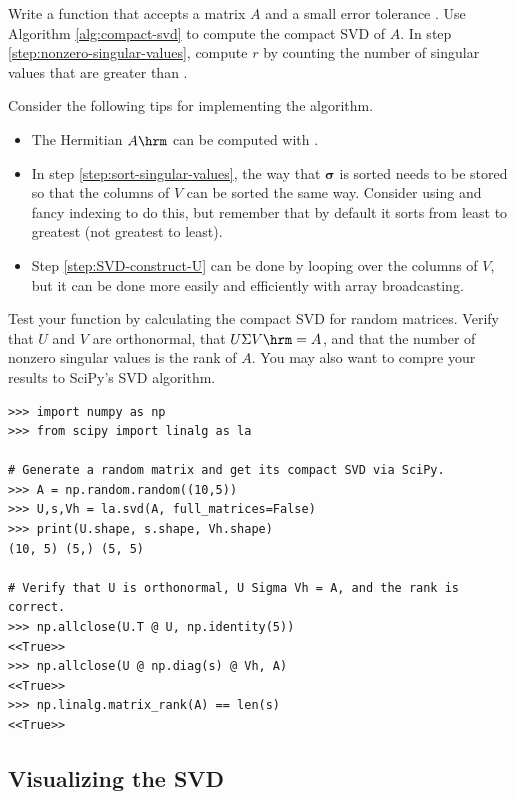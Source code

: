 \begin{problem} %
Write a function that accepts a matrix $A$ and a small error tolerance .
Use Algorithm \ref{alg:compact-svd} to compute the compact SVD of $A$.
In step \ref{step:nonzero-singular-values}, compute $r$ by counting the number of singular values that are greater than .

Consider the following tips for implementing the algorithm.
\begin{itemize}
    \item The Hermitian $A\hrm$ can be computed with .
    \item In step \ref{step:sort-singular-values}, the way that $\boldsymbol{\sigma}$ is sorted needs to be stored so that the columns of $V$ can be sorted the same way.
    Consider using  and fancy indexing to do this, but remember that by default it sorts from least to greatest (not greatest to least).
    \item Step \ref{step:SVD-construct-U} can be done by looping over the columns of $V$, but it can be done more easily and efficiently with array broadcasting.
\end{itemize}

Test your function by calculating the compact SVD for random matrices.
Verify that $U$ and $V$ are orthonormal, that $U\Sigma V\hrm = A$, and that the number of nonzero singular values is the rank of $A$.
You may also want to compre your results to SciPy's SVD algorithm.
%
\begin{lstlisting}
>>> import numpy as np
>>> from scipy import linalg as la

# Generate a random matrix and get its compact SVD via SciPy.
>>> A = np.random.random((10,5))
>>> U,s,Vh = la.svd(A, full_matrices=False)
>>> print(U.shape, s.shape, Vh.shape)
(10, 5) (5,) (5, 5)

# Verify that U is orthonormal, U Sigma Vh = A, and the rank is correct.
>>> np.allclose(U.T @ U, np.identity(5))
<<True>>
>>> np.allclose(U @ np.diag(s) @ Vh, A)
<<True>>
>>> np.linalg.matrix_rank(A) == len(s)
<<True>>
\end{lstlisting}
\label{prob:calculate-compact-svd}
\end{problem}

\subsection*{Visualizing the SVD} %

